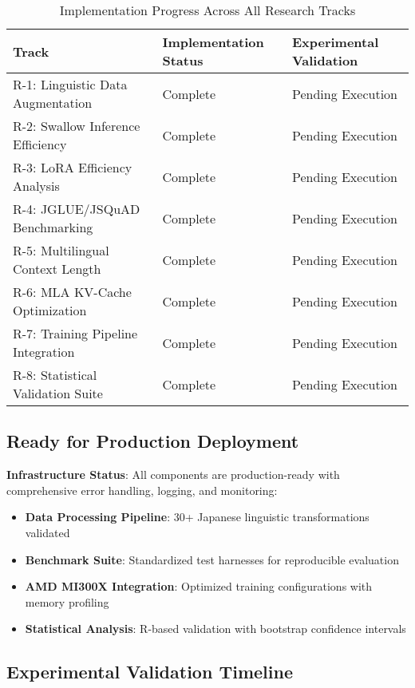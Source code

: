 \documentclass[12pt,a4paper]{article}
\begin{document}
\begin{table}[h]
\centering
\begin{tabular}{@{}lll@{}}
\toprule
\textbf{Track} & \textbf{Implementation Status} & \textbf{Experimental Validation} \\
\midrule
R-1: Linguistic Data Augmentation & Complete & Pending Execution \\
R-2: Swallow Inference Efficiency & Complete & Pending Execution \\
R-3: LoRA Efficiency Analysis & Complete & Pending Execution \\
R-4: JGLUE/JSQuAD Benchmarking & Complete & Pending Execution \\
R-5: Multilingual Context Length & Complete & Pending Execution \\
R-6: MLA KV-Cache Optimization & Complete & Pending Execution \\
R-7: Training Pipeline Integration & Complete & Pending Execution \\
R-8: Statistical Validation Suite & Complete & Pending Execution \\
\bottomrule
\end{tabular}
\caption{Implementation Progress Across All Research Tracks}
\label{tab:implementation_status}
\end{table}

\subsection{Ready for Production Deployment}

\textbf{Infrastructure Status}: All components are production-ready with comprehensive error handling, logging, and monitoring:

\begin{itemize}
\item \textbf{Data Processing Pipeline}: 30+ Japanese linguistic transformations validated
\item \textbf{Benchmark Suite}: Standardized test harnesses for reproducible evaluation
\item \textbf{AMD MI300X Integration}: Optimized training configurations with memory profiling
\item \textbf{Statistical Analysis}: R-based validation with bootstrap confidence intervals
\end{itemize}

\subsection{Experimental Validation Timeline}
\end{document}
